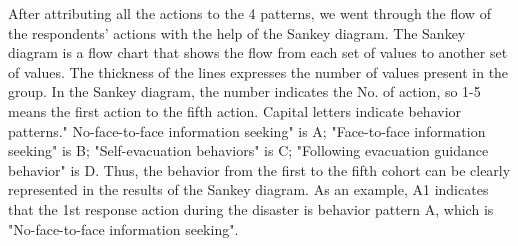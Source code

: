 After attributing all the actions to the 4 patterns, we went through the flow of the respondents' actions with the help of the Sankey diagram. The Sankey diagram is a flow chart that shows the flow from each set of values to another set of values. The thickness of the lines expresses the number of values present in the group. In the Sankey diagram, the number indicates the No. of action, so 1-5 means the first action to the fifth action. Capital letters indicate behavior patterns." No-face-to-face information seeking" is A; "Face-to-face information seeking" is B; "Self-evacuation behaviors" is C; "Following evacuation guidance behavior" is D. Thus, the behavior from the first to the fifth cohort can be clearly represented in the results of the Sankey diagram. As an example, A1 indicates that the 1st response action during the disaster is behavior pattern A, which is "No-face-to-face information seeking".




























